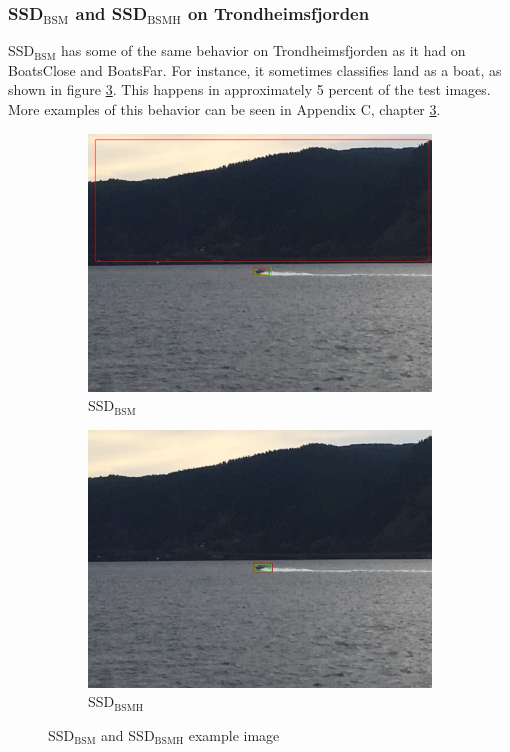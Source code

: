 \subsubsection{SSD$_{\text{BSM}}$ and SSD$_{\text{BSMH}}$ on Trondheimsfjorden}

SSD$_{\text{BSM}}$ has some of the same behavior on Trondheimsfjorden as it had on BoatsClose and BoatsFar. For instance, it sometimes classifies land as a boat, as shown in figure \ref{fig:ssd_trf_bigbox}. This happens in approximately 5 percent of the test images. More examples of this behavior can be seen in Appendix C, chapter \ref{fig:ssd_trf_bigbox}.

\begin{figure}[h!]
\begin{subfigure}{.5\textwidth}
  \centering
  \includegraphics[width=0.8\linewidth]{results/case_buildings/ssdtrf/ssd2/grov2/IMG_2325.jpg}
  \caption{SSD$_{\text{BSM}}$}
  \label{fig:ex_trf_prec_rec_yolo}
\end{subfigure}%
\begin{subfigure}{.5\textwidth}
  \centering
  \includegraphics[width=.8\linewidth]{results/case_buildings/ssdtrf/ssd3/grov2/IMG_2325.jpg}
  \caption{SSD$_{\text{BSMH}}$}
  \label{fig:ex_trf_prec_rec_ssd}
\end{subfigure}
\caption{SSD$_{\text{BSM}}$ and SSD$_{\text{BSMH}}$ example image}
\label{fig:ssd_trf_bigbox}
\end{figure}

